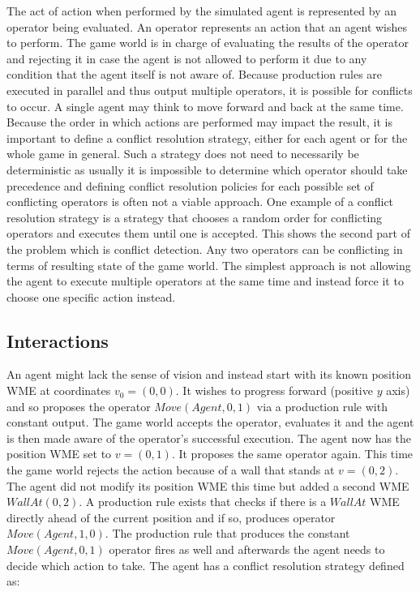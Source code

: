 The act of action when performed by the simulated agent is represented by an operator being evaluated.
An operator represents an action that an agent wishes to perform.
The game world is in charge of evaluating the results of the operator and rejecting it in case the agent is not allowed to perform it due to any condition that the agent itself is not aware of.
Because production rules are executed in parallel and thus output multiple operators, it is possible for conflicts to occur.
A single agent may think to move forward and back at the same time.
Because the order in which actions are performed may impact the result, it is important to define a conflict resolution strategy, either for each agent or for the whole game in general.
Such a strategy does not need to necessarily be deterministic as usually it is impossible to determine which operator should take precedence and defining conflict resolution policies for each possible set of conflicting operators is often not a viable approach.
One example of a conflict resolution strategy is a strategy that chooses a random order for conflicting operators and executes them until one is accepted.
This shows the second part of the problem which is conflict detection.
Any two operators can be conflicting in terms of resulting state of the game world.
The simplest approach is not allowing the agent to execute multiple operators at the same time and instead force it to choose one specific action instead.

\subsection{Interactions}

An agent might lack the sense of vision and instead start with its known position WME at coordinates $v_0=(0, 0)$.
It wishes to progress forward (positive $y$ axis) and so proposes the operator $Move(Agent, 0, 1)$ via a production rule with constant output.
The game world accepts the operator, evaluates it and the agent is then made aware of the operator's successful execution.
The agent now has the position WME set to $v=(0, 1)$.
It proposes the same operator again.
This time the game world rejects the action because of a wall that stands at $v=(0, 2)$.
The agent did not modify its position WME this time but added a second WME $WallAt(0, 2)$.
A production rule exists that checks if there is a $WallAt$ WME directly ahead of the current position and if so, produces operator $Move(Agent, 1, 0)$.
The production rule that produces the constant $Move(Agent, 0, 1)$ operator fires as well and afterwards the agent needs to decide which action to take.
The agent has a conflict resolution strategy defined as:

